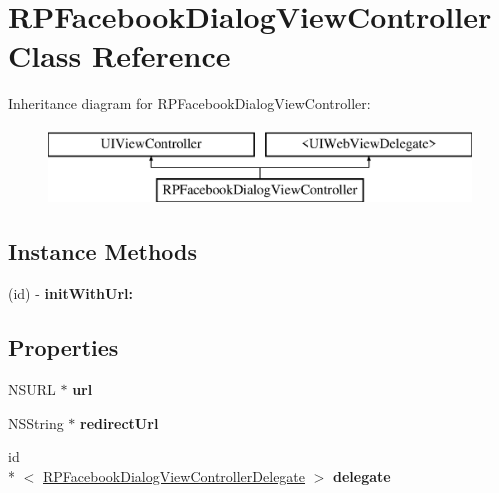 \hypertarget{interface_r_p_facebook_dialog_view_controller}{\section{R\-P\-Facebook\-Dialog\-View\-Controller Class Reference}
\label{interface_r_p_facebook_dialog_view_controller}
}
Inheritance diagram for R\-P\-Facebook\-Dialog\-View\-Controller\-:\begin{figure}[H]
\begin{center}
\leavevmode
\includegraphics[height=2.000000cm]{interface_r_p_facebook_dialog_view_controller}
\end{center}
\end{figure}
\subsection*{Instance Methods}
\begin{DoxyCompactItemize}
\item 
(id) -\/ {\bfseries init\-With\-Url\-:}
\end{DoxyCompactItemize}
\subsection*{Properties}
\begin{DoxyCompactItemize}
\item 
\hypertarget{interface_r_p_facebook_dialog_view_controller_ae3adcf731ee68621e97681d3eb5ffb7f}{N\-S\-U\-R\-L $\ast$ {\bfseries url}}\label{interface_r_p_facebook_dialog_view_controller_ae3adcf731ee68621e97681d3eb5ffb7f}

\item 
\hypertarget{interface_r_p_facebook_dialog_view_controller_acaffdd4e70ea7677224e0f94d190c1df}{N\-S\-String $\ast$ {\bfseries redirect\-Url}}\label{interface_r_p_facebook_dialog_view_controller_acaffdd4e70ea7677224e0f94d190c1df}

\item 
\hypertarget{interface_r_p_facebook_dialog_view_controller_a76b6f58e8ae9b8de0b28492369ad2492}{id\\*
$<$ \hyperlink{protocol_r_p_facebook_dialog_view_controller_delegate-p}{R\-P\-Facebook\-Dialog\-View\-Controller\-Delegate} $>$ {\bfseries delegate}}\label{interface_r_p_facebook_dialog_view_controller_a76b6f58e8ae9b8de0b28492369ad2492}

\end{DoxyCompactItemize}


